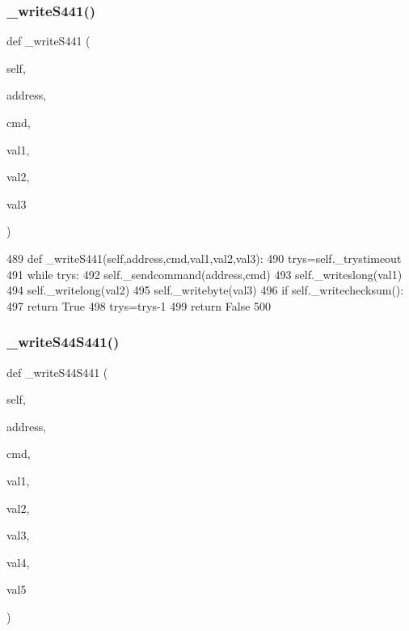 \subsubsection{\texorpdfstring{\+\_\+write\+S441()}{\_writeS441()}}
{\footnotesize\ttfamily def \+\_\+write\+S441 (\begin{DoxyParamCaption}\item[{}]{self,  }\item[{}]{address,  }\item[{}]{cmd,  }\item[{}]{val1,  }\item[{}]{val2,  }\item[{}]{val3 }\end{DoxyParamCaption})\hspace{0.3cm}{\ttfamily [private]}}


\begin{DoxyCode}
489     \textcolor{keyword}{def }\_writeS441(self,address,cmd,val1,val2,val3):
490         trys=self.\_trystimeout
491         \textcolor{keywordflow}{while} trys:
492             self.\_sendcommand(address,cmd)
493             self.\_writeslong(val1)
494             self.\_writelong(val2)
495             self.\_writebyte(val3)
496             \textcolor{keywordflow}{if} self.\_writechecksum():
497                 \textcolor{keywordflow}{return} \textcolor{keyword}{True}
498             trys=trys-1
499         \textcolor{keywordflow}{return} \textcolor{keyword}{False}
500 
\end{DoxyCode}
\mbox{\label{classtoxic__hardware_1_1roboclaw__3_1_1Roboclaw_a960511b0293744d9f64a79f38d944a60}} 
\subsubsection{\texorpdfstring{\+\_\+write\+S44\+S441()}{\_writeS44S441()}}
{\footnotesize\ttfamily def \+\_\+write\+S44\+S441 (\begin{DoxyParamCaption}\item[{}]{self,  }\item[{}]{address,  }\item[{}]{cmd,  }\item[{}]{val1,  }\item[{}]{val2,  }\item[{}]{val3,  }\item[{}]{val4,  }\item[{}]{val5 }\end{DoxyParamCaption})\hspace{0.3cm}{\ttfamily [private]}}


